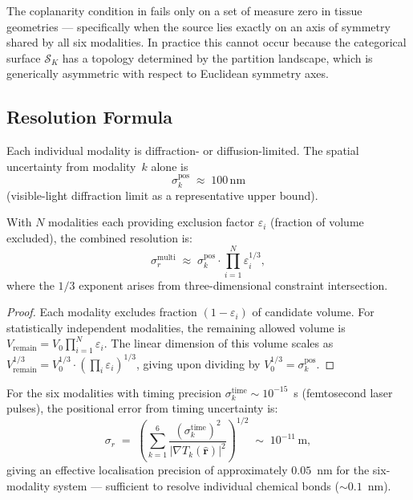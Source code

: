 \begin{remark}
The coplanarity condition in  fails only on a set of
measure zero in tissue geometries --- specifically when the source lies
exactly on an axis of symmetry shared by all six modalities.  In practice
this cannot occur because the categorical surface $\mathcal{S}_K$ has a
topology determined by the partition landscape, which is generically
asymmetric with respect to Euclidean symmetry axes.
\end{remark}

\subsection{Resolution Formula}

Each individual modality is diffraction- or diffusion-limited.  The spatial
uncertainty from modality~$k$ alone is
\[
  \sigma_k^{\mathrm{pos}} \;\approx\; 100\,\mathrm{nm}
\]
(visible-light diffraction limit as a representative upper bound).

\begin{theorem}
\label{thm:resolution}
With $N$ modalities each providing exclusion factor $\varepsilon_i$ (fraction
of volume excluded), the combined resolution is:
\begin{equation}
    \sigma_r^\mathrm{multi}
    \;\approx\;
    \sigma_k^\mathrm{pos} \cdot \prod_{i=1}^{N} \varepsilon_i^{1/3},
    \label{eq:resolution-enhancement}
\end{equation}
where the $1/3$ exponent arises from three-dimensional constraint intersection.
\end{theorem}

\begin{proof}
Each modality excludes fraction $(1-\varepsilon_i)$ of candidate volume.  For
statistically independent modalities, the remaining allowed volume is
$V_\mathrm{remain} = V_0 \prod_{i=1}^N \varepsilon_i$.  The linear dimension
of this volume scales as $V_\mathrm{remain}^{1/3} = V_0^{1/3} \cdot
(\prod_i \varepsilon_i)^{1/3}$, giving  upon
dividing by $V_0^{1/3} = \sigma_k^\mathrm{pos}$.
\end{proof}

For the six modalities with timing precision
$\sigma_k^{\mathrm{time}} \sim 10^{-15}$~s (femtosecond laser pulses), the
positional error from timing uncertainty is:
\begin{equation}
  \sigma_r
  \;=\; \left(\sum_{k=1}^{6}
      \frac{(\sigma_k^{\mathrm{time}})^2}{|\nabla T_k(\hat{\mathbf{r}})|^2}
    \right)^{1/2}
  \;\sim\; 10^{-11}\,\mathrm{m},
  \label{eq:positional-error}
\end{equation}
giving an effective localisation precision of approximately $0.05$~nm for
the six-modality system --- sufficient to resolve individual chemical bonds
($\sim 0.1$~nm).

